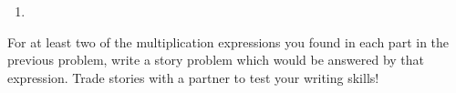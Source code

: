 \documentclass[nooutcomes]{ximera}
\begin{document}
\begin{problem}
\begin{enumerate}
{\begin{tabular}{p{0.5cm}p{0.5cm}p{0.5cm}p{0.5cm}p{0.5cm}p{0.5cm}p{0.5cm}p{0.5cm}p{0.5cm}p{0.5cm}p{0.5cm}}
        \end{tabular} }
    \item \leavevmode\vadjust{\vspace{-\baselineskip}}
\end{enumerate}
\end{problem}

\begin{problem}
 For at least two of the multiplication expressions you found in each part in the previous problem, write a story problem which would be answered by that expression.  Trade stories with a partner to test your writing skills!
\end{problem}
\end{document}
